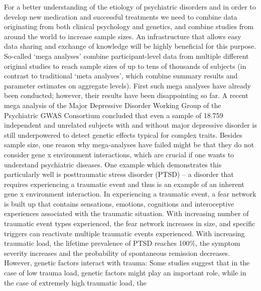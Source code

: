\documentclass[a4paper,UKenglish]{dagrep}
\begin{document}
{}
\license
For a better understanding of the etiology of psychiatric disorders and in order
to develop new medication and successful treatments we need to combine data
originating from both clinical psychology and genetics, and combine studies from
around the world to increase sample sizes. An infrastructure that allows easy
data sharing and exchange of knowledge will be highly beneficial for this purpose. 
So-called `mega analyses' combine participant-level data from multiple different
original studies to reach sample sizes of up to tens of thousands of subjects
(in contrast to traditional `meta analyses', which combine summary results and
parameter estimates on aggregate levels). First such mega analyses have already
been conducted; however, their results have been disappointing so far. A recent
mega analysis of the Major Depressive Disorder Working Group of the Psychiatric
GWAS Consortium concluded that even a sample of 18.759 independent and unrelated
subjects with and without major depressive disorder is still underpowered to
detect genetic effects typical for complex traits. 
Besides sample size, one reason why mega-analyses have failed might be that they
do not consider gene x environment interactions, which are crucial if one wants
to understand psychiatric diseases. One example which demonstrates this
particularly well is posttraumatic stress disorder (PTSD) – a disorder that
requires experiencing a traumatic event and thus is an example of an inherent
gene x environment interaction. In experiencing a traumatic event, a fear
network is built up that contains sensations, emotions, cognitions and
interoceptive experiences associated with the traumatic situation. With
increasing number of traumatic event types experienced, the fear network
increases in size, and specific triggers can reactivate multiple traumatic
events experienced. With increasing traumatic load, the lifetime prevalence of
PTSD reaches 100\%, the symptom severity increases and the probability of
spontaneous remission decreases. However, genetic factors interact with trauma:
Some studies suggest that in the case of low trauma load, genetic factors might
play an important role, while in the case of extremely high traumatic load, the
\end{document}
